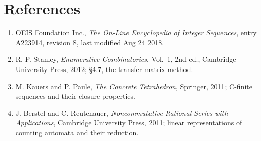 \documentclass[11pt]{article}
\theoremstyle{definition}
\begin{document}
\section{References}

\begin{enumerate}

\item OEIS Foundation Inc., \emph{The On-Line Encyclopedia of Integer Sequences}, entry \href{https://oeis.org/A223914}{A223914}, revision 8, last modified Aug 24 2018.

\item R. P. Stanley, \emph{Enumerative Combinatorics}, Vol.~1, 2nd ed., Cambridge University Press, 2012; \S4.7, the transfer-matrix method.

\item M. Kauers and P. Paule, \emph{The Concrete Tetrahedron}, Springer, 2011; C-finite sequences and their closure properties.

\item J. Berstel and C. Reutenauer, \emph{Noncommutative Rational Series with Applications}, Cambridge University Press, 2011; linear representations of counting automata and their reduction.

\end{enumerate}
\end{document}

